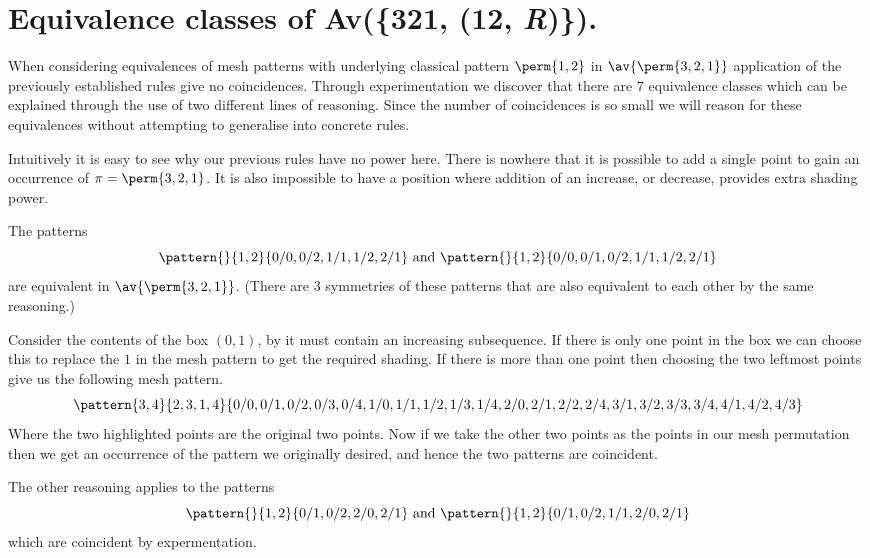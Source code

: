 \section{Equivalence classes of Av(\{321, (12, \textit{R})\}).}
When considering equivalences of mesh patterns with underlying classical
pattern \(\perm{1,2}\) in \(\av{\perm{3,2,1}}\) application of the previously
established rules give no coincidences. Through experimentation we discover
that there are \(7\) equivalence classes which can be explained through the
use of two different lines of reasoning. Since the number of coincidences is
so small we will reason for these equivalences without attempting to generalise
into concrete rules.

Intuitively it is easy to see why our previous rules have no
power here. There is nowhere that it is possible to add a single point to
gain an occurrence of \(\pi = \perm{3,2,1}\). It is also impossible to have
a position where addition of an increase, or decrease, provides extra
shading power.

The patterns 
\begin{equation*}
    \pattern{}{1,2}{0/0, 0/2, 1/1, 1/2, 2/1} \text { and } \pattern{}{1,2}{0/0, 0/1, 0/2, 1/1, 1/2, 2/1}
\end{equation*}
are equivalent in \(\av{\perm{3,2,1}}\). (There are 3 symmetries of these
patterns that are also equivalent to each other by the same reasoning.)

Consider the contents of the box \((0,1)\), by  it
must contain an increasing subsequence. If there is only one point in the box
we can choose this to replace the \(1\) in the mesh pattern to get the
required shading. If there is more than one point then choosing the
two leftmost points give us the following mesh pattern.
\begin{equation*}
    \pattern{3,4}{2,3,1,4}{0/0, 0/1, 0/2, 0/3, 0/4,
                            1/0, 1/1, 1/2, 1/3, 1/4,
                            2/0, 2/1,2/2, 2/4,
                            3/1, 3/2, 3/3, 3/4,
                            4/1, 4/2, 4/3}
\end{equation*}
Where the two highlighted points are the original two points.
Now if we take the other two points as the points in our
mesh permutation then we get an occurrence of the pattern
we originally desired, and hence the two patterns are coincident.

The other reasoning applies to the patterns
\begin{equation*}
    \pattern{}{1,2}{0/1,0/2,2/0,2/1} \text{ and } \pattern{}{1,2}{0/1,0/2,1/1,2/0,2/1}
\end{equation*}
which are coincident by expermentation.

